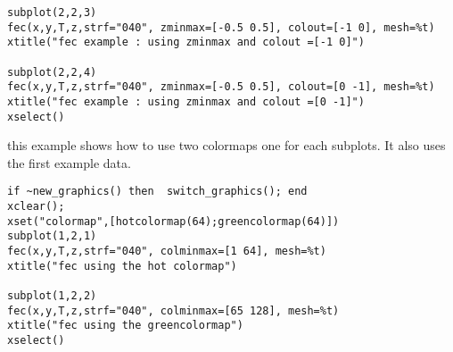 \begin{examples}
\begin{Verbatim}
subplot(2,2,3)
fec(x,y,T,z,strf="040", zminmax=[-0.5 0.5], colout=[-1 0], mesh=%t)
xtitle("fec example : using zminmax and colout =[-1 0]")

subplot(2,2,4)
fec(x,y,T,z,strf="040", zminmax=[-0.5 0.5], colout=[0 -1], mesh=%t)
xtitle("fec example : using zminmax and colout =[0 -1]")
xselect()
\end{Verbatim}

\noindent this example shows how to use two colormaps one for each subplots. It
also uses the first example data.

\begin{Verbatim}
if ~new_graphics() then  switch_graphics(); end
xclear();
xset("colormap",[hotcolormap(64);greencolormap(64)])
subplot(1,2,1)
fec(x,y,T,z,strf="040", colminmax=[1 64], mesh=%t)
xtitle("fec using the hot colormap")

subplot(1,2,2)
fec(x,y,T,z,strf="040", colminmax=[65 128], mesh=%t)
xtitle("fec using the greencolormap")
xselect()
\end{Verbatim}
\end{examples}
  \begin{manseealso}
      
  \end{manseealso}

